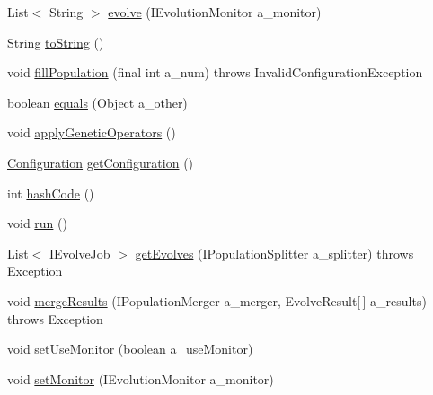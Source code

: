 \begin{DoxyCompactItemize}
\item 
List$<$ String $>$ \hyperlink{classorg_1_1jgap_1_1_genotype_aa740dd753d31620166979199a38d5a50}{evolve} (I\-Evolution\-Monitor a\-\_\-monitor)
\item 
String \hyperlink{classorg_1_1jgap_1_1_genotype_a658a541940e9be8ef474375091ff31ae}{to\-String} ()
\item 
void \hyperlink{classorg_1_1jgap_1_1_genotype_ac622bbf487c0ab7344d46ca669607cef}{fill\-Population} (final int a\-\_\-num)  throws Invalid\-Configuration\-Exception 
\item 
boolean \hyperlink{classorg_1_1jgap_1_1_genotype_ab9bba698920b358bb53131338c9d130a}{equals} (Object a\-\_\-other)
\item 
void \hyperlink{classorg_1_1jgap_1_1_genotype_adf2dbe6d60d6c74592cb1e6398cece2c}{apply\-Genetic\-Operators} ()
\item 
\hyperlink{classorg_1_1jgap_1_1_configuration}{Configuration} \hyperlink{classorg_1_1jgap_1_1_genotype_a786848d2da4fd3d87f9f4caa8f9dd58b}{get\-Configuration} ()
\item 
int \hyperlink{classorg_1_1jgap_1_1_genotype_abe044a5473e935c2093ee3c6c18775f7}{hash\-Code} ()
\item 
void \hyperlink{classorg_1_1jgap_1_1_genotype_a0d14c5400197e3c43f9d1f0666309a85}{run} ()
\item 
List$<$ I\-Evolve\-Job $>$ \hyperlink{classorg_1_1jgap_1_1_genotype_a84fd1b399188ea10c0af4b7c1152e0c2}{get\-Evolves} (I\-Population\-Splitter a\-\_\-splitter)  throws Exception 
\item 
void \hyperlink{classorg_1_1jgap_1_1_genotype_aa2b0341edc420ad61e797508b8bf4dd5}{merge\-Results} (I\-Population\-Merger a\-\_\-merger, Evolve\-Result\mbox{[}$\,$\mbox{]} a\-\_\-results)  throws Exception 
\item 
void \hyperlink{classorg_1_1jgap_1_1_genotype_abba6c68b3e8388be6884a35f5600e8cb}{set\-Use\-Monitor} (boolean a\-\_\-use\-Monitor)
\item 
void \hyperlink{classorg_1_1jgap_1_1_genotype_af3f49ba90cc8515817366792b7bce320}{set\-Monitor} (I\-Evolution\-Monitor a\-\_\-monitor)
\end{DoxyCompactItemize}
